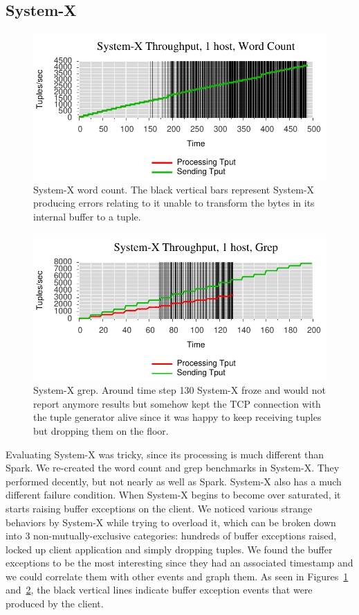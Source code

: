 \subsection{System-X}
\label{ssec:sysx1}

\begin{figure}[t]
\centering
\includegraphics[width=1\linewidth]{figures/sb1_tput.pdf}
\caption{System-X word count. The black vertical bars represent System-X producing errors relating to it unable to transform the bytes in its internal buffer to a tuple.}
\label{fig:sb1-tput}
\end{figure}

\begin{figure}[t]
\centering
\includegraphics[width=1\linewidth]{figures/sb2_tput.pdf}
\caption{System-X grep. Around time step 130 System-X froze and would not report anymore results but somehow kept the TCP connection with the tuple generator alive since it was happy to keep receiving tuples but dropping them on the floor.}
\label{fig:sb2-tput}
\end{figure}

Evaluating System-X was tricky, since its processing is much different than
Spark. We re-created the word count and grep benchmarks in System-X.  They
performed decently, but not nearly as well as Spark. System-X also has a much
different failure condition. When System-X begins to become over saturated, it
starts raising buffer exceptions on the client. We noticed various strange behaviors
by System-X while trying to overload it, which can be broken down into 3
non-mutually-exclusive categories: hundreds of buffer exceptions raised, locked
up client application and simply dropping tuples. We found the buffer
exceptions to be the most interesting since they had an associated timestamp
and we could correlate them with other events and graph them. As seen in 
Figures~\ref{fig:sb1-tput} and~\ref{fig:sb2-tput}, the black vertical lines
indicate buffer exception events that were produced by the client.

